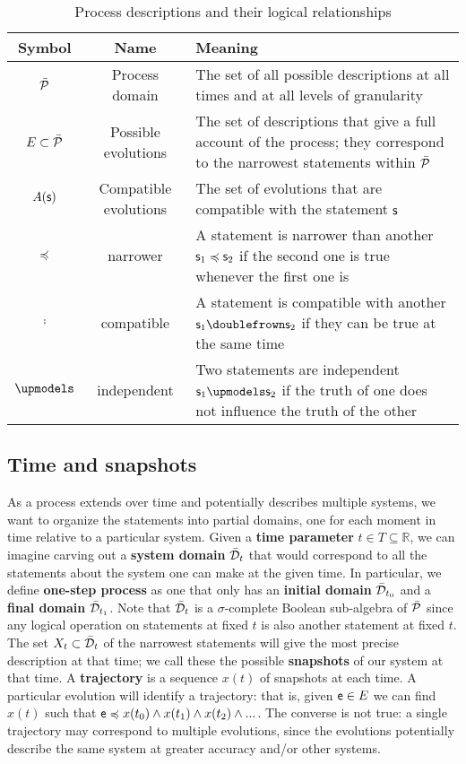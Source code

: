 \documentclass[letterpaper]{article}
\begin{document}
\begin{table}[h!]
	\centering
\begin{tabular}[h]{|c|c|p{6cm}|}
	\hline 
	Symbol & Name & Meaning \\ 
	\hline 
	$\tdomain[P]$ & Process domain & The set of all possible descriptions at all times and at all levels of granularity \\ 
	\hline 
	$E \subset \tdomain[P]$ & Possible evolutions & The set of descriptions that give a full account of the process; they correspond to the narrowest statements within $\tdomain[P]$ \\ 
	\hline 
	$A(\stmt)$ & Compatible evolutions & The set of evolutions that are compatible with the statement $\stmt$ \\ 
	\hline 
	$\narrower$ & narrower & A statement is narrower than another $\stmt_1 \narrower \stmt_2$ if the second one is true whenever the first one is \\ 
	\hline 
	$\comp$ & compatible & A statement is compatible with another $\stmt_1 \comp \stmt_2$ if they can be true at the same time \\ 
	\hline 
	$\indep$ & independent & Two statements are independent  $\stmt_1 \indep \stmt_2$ if the truth of one does not influence the truth of the other \\ 
\hline 
\end{tabular} 
	\caption{Process descriptions and their logical relationships}
	\label{table:logic}
\end{table}


\subsection{Time and snapshots}

As a process extends over time and potentially describes multiple systems, we want to organize the statements into partial domains, one for each moment in time relative to a particular system. Given a \textbf{time parameter} $t \in T \subseteq \mathbb{R}$, we can imagine carving out a \textbf{system domain} $\tdomain_t$ that would correspond to all the statements about the system one can make at the given time. In particular, we define \textbf{one-step process} as one that only has an \textbf{initial domain} $\tdomain_{t_0}$ and a \textbf{final domain} $\tdomain_{t_1}$. Note that $\tdomain_t$ is a $\sigma$-complete Boolean sub-algebra of $\tdomain[P]$ since any logical operation on statements at fixed $t$ is also another statement at fixed $t$. The set $X_t \subset \tdomain_t$ of the narrowest statements will give the most precise description at that time; we call these the  possible \textbf{snapshots} of our system at that time. A \textbf{trajectory} is a sequence $x(t)$ of snapshots at each time. A particular evolution will identify a trajectory: that is, given $\stmt[e] \in E$ we can find $x(t)$ such that $\stmt[e] \narrower x(t_0) \AND x(t_1) \AND x(t_2) \AND ... $. The converse is not true: a single trajectory may correspond to multiple evolutions, since the evolutions potentially describe the same system at greater accuracy and/or other systems.
\end{document}
